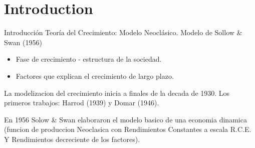\documentclass[t,11pt]{beamer}
\subtitle{Crecimiento Económico}
\date{December 9th, 2010}
\title{\insertlecture}
\author{Macroeconomía}
\institute{2020}
\begin{document}
\nonstopmode %


\section*{Introduction}


\begin{frame}[plain]
  \maketitle
\end{frame}
\addtocounter{framenumber}{-1}%


\begin{frame}{Introducción}
Teoría del Crecimiento: Modelo Neoclásico. 
Modelo de Sollow \& Swan (1956)
\begin{itemize}
    \item Fase de crecimiento - estructura de la sociedad.
    \item Factores que explican el crecimiento de largo plazo.
\end{itemize}
La modelizacion del crecimiento inicia a finales de la decada de 1930. Los primeros trabajos: Harrod (1939) y Domar (1946). 
\medskip 

En 1956 Solow \& Swan elaboraron el modelo basico de una economia dinamica (funcion de produccion Neoclasica con Rendimientos Constantes a escala R.C.E. Y Rendimientos decreciente de los factores). 
\end{frame}

\section{}
\end{document}

